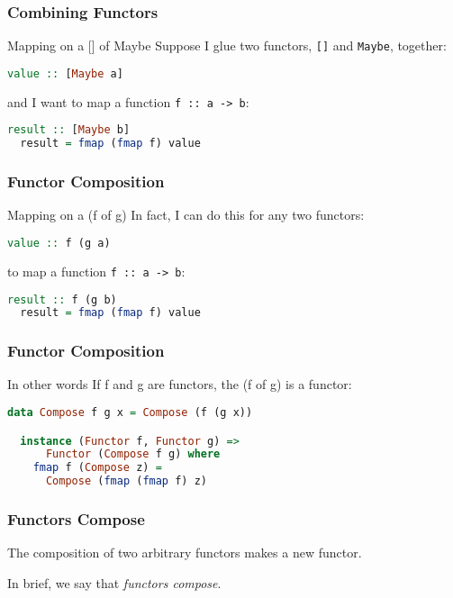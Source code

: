 \begin{frame}[fragile]
\frametitle{Combining Functors}
\begin{block}{Mapping on a [] of Maybe}
Suppose I glue two functors, \lstinline$[]$ and \lstinline$Maybe$, together:
\begin{lstlisting}[language=haskell]
  value :: [Maybe a]
\end{lstlisting}
and I want to map a function \lstinline$f :: a -> b$:
\begin{lstlisting}[language=haskell]
  result :: [Maybe b]
  result = fmap (fmap f) value
\end{lstlisting}
\end{block}
\end{frame}

\begin{frame}[fragile]
\frametitle{Functor Composition}
\begin{block}{Mapping on a (f of g)}
In fact, I can do this for any two functors:
\begin{lstlisting}[language=haskell]
  value :: f (g a)
\end{lstlisting}
to map a function \lstinline$f :: a -> b$:
\begin{lstlisting}[language=haskell]
  result :: f (g b)
  result = fmap (fmap f) value
\end{lstlisting}
\end{block}
\end{frame}

\begin{frame}[fragile]
\frametitle{Functor Composition}
\begin{block}{In other words}
If f and g are functors, the (f of g) is a functor:
\begin{lstlisting}[language=haskell]
  data Compose f g x = Compose (f (g x))

  instance (Functor f, Functor g) =>
      Functor (Compose f g) where
    fmap f (Compose z) =
      Compose (fmap (fmap f) z)
\end{lstlisting}
\end{block}
\end{frame}

\begin{frame}
\frametitle{Functors Compose}
The composition of two arbitrary functors makes a new functor.

In brief, we say that \emph{functors compose}.
\end{frame}
